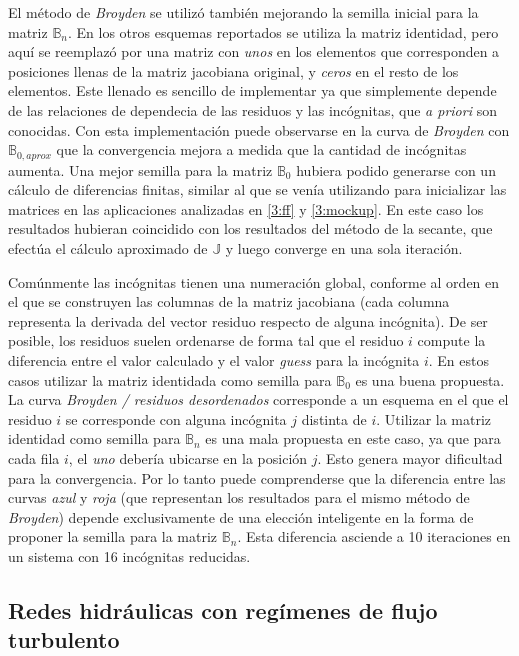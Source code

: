 El método de \textit{Broyden} se utilizó también mejorando la semilla inicial para la matriz $\mathbb{B}_n$.
En los otros esquemas reportados se utiliza la matriz identidad,
pero aquí se reemplazó por una matriz con \textit{unos} en los elementos que corresponden a posiciones llenas de la matriz jacobiana original,
y \textit{ceros} en el resto de los elementos.
Este llenado es sencillo de implementar ya que simplemente depende de las relaciones de dependecia de las residuos y las incógnitas, que \textit{a priori} son conocidas.
Con esta implementación puede observarse en la curva de \textit{Broyden} con $\mathbb{B}_{0,aprox}$ que la convergencia mejora a medida que la cantidad de incógnitas aumenta.
Una mejor semilla para la matriz $\mathbb{B}_{0}$ hubiera podido generarse con un cálculo de diferencias finitas,
similar al que se venía utilizando para inicializar las matrices en las aplicaciones analizadas en \ref{3:ff} y \ref{3:mockup}.
En este caso los resultados hubieran coincidido con los resultados del método de la secante, que efectúa el cálculo aproximado de $\mathbb{J}$ y luego converge en una sola iteración.

Comúnmente las incógnitas tienen una numeración global, conforme al orden en el que se construyen las columnas de la matriz jacobiana
(cada columna representa la derivada del vector residuo respecto de alguna incógnita).
De ser posible, los residuos suelen ordenarse de forma tal que el residuo $i$ compute la diferencia entre el valor calculado y el valor \textit{guess} para la incógnita $i$.
En estos casos utilizar la matriz identidada como semilla para $\mathbb{B}_{0}$ es una buena propuesta.
La curva \textit{Broyden / residuos desordenados} corresponde a un esquema en el que el residuo $i$ se corresponde con alguna incógnita $j$ distinta de $i$.
Utilizar la matriz identidad como semilla para $\mathbb{B}_n$ es una mala propuesta en este caso,
ya que para cada fila $i$, el \textit{uno} debería ubicarse en la posición $j$.
Esto genera mayor dificultad para la convergencia.
Por lo tanto puede comprenderse que la diferencia entre las curvas \textit{azul} y \textit{roja} (que representan los resultados para el mismo método de \textit{Broyden})
depende exclusivamente de una elección inteligente en la forma de proponer la semilla para la matriz $\mathbb{B}_n$.
Esta diferencia asciende a 10 iteraciones en un sistema con 16 incógnitas reducidas.

\subsection*{Redes hidráulicas con regímenes de flujo turbulento}
\label{turbulent}

